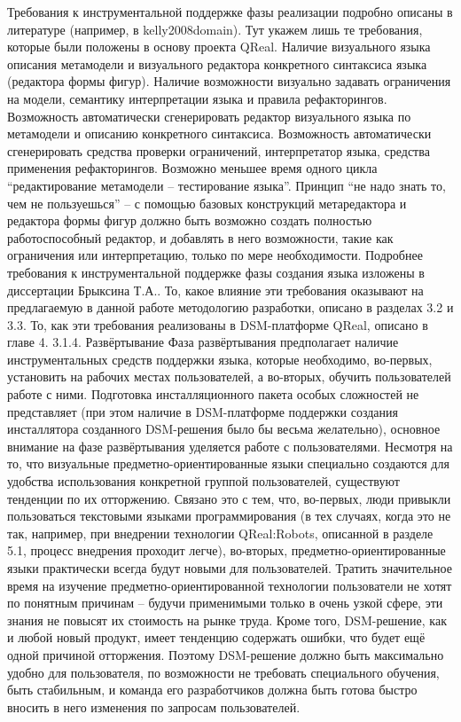 	Требования к инструментальной поддержке фазы реализации подробно описаны в литературе (например, в kelly2008domain). Тут укажем лишь те требования, которые были положены в основу проекта QReal.
Наличие визуального языка описания метамодели и визуального редактора конкретного синтаксиса языка (редактора формы фигур).
Наличие возможности визуально задавать ограничения на модели, семантику интерпретации языка и правила рефакторингов.
Возможность автоматически сгенерировать редактор визуального языка по метамодели и описанию конкретного синтаксиса.
Возможность автоматически сгенерировать средства проверки ограничений, интерпретатор языка, средства применения рефакторингов.
Возможно меньшее время одного цикла “редактирование метамодели – тестирование языка”.
Принцип “не надо знать то, чем не пользуешься” – с помощью базовых конструкций метаредактора и редактора формы фигур должно быть возможно создать полностью работоспособный редактор, и добавлять в него возможности, такие как ограничения или интерпретацию, только по мере необходимости.
	Подробнее требования к инструментальной поддержке фазы создания языка изложены в диссертации Брыксина Т.А.. То, какое влияние эти требования оказывают на предлагаемую в данной работе методологию разработки, описано в разделах 3.2 и 3.3. То, как эти требования реализованы в DSM-платформе QReal, описано в главе 4.
3.1.4. Развёртывание
	Фаза развёртывания предполагает наличие инструментальных средств поддержки языка, которые необходимо, во-первых, установить на рабочих местах пользователей, а во-вторых, обучить пользователей работе с ними. Подготовка инсталляционного пакета особых сложностей не представляет (при этом наличие в DSM-платформе поддержки создания инсталлятора созданного DSM-решения было бы весьма желательно), основное внимание на фазе развёртывания уделяется работе с пользователями. Несмотря на то, что визуальные предметно-ориентированные языки специально создаются для удобства использования конкретной группой пользователей, существуют тенденции по их отторжению. Связано это с тем, что, во-первых, люди привыкли пользоваться текстовыми языками программирования (в тех случаях, когда это не так, например, при внедрении технологии QReal:Robots, описанной в разделе 5.1, процесс внедрения проходит легче), во-вторых, предметно-ориентированные языки практически всегда будут новыми для пользователей. Тратить значительное время на изучение предметно-ориентированной технологии пользователи не хотят по понятным причинам – будучи применимыми только в очень узкой сфере, эти знания не повысят их стоимость на рынке труда. Кроме того, DSM-решение, как и любой новый продукт, имеет тенденцию содержать ошибки, что будет ещё одной причиной отторжения. Поэтому DSM-решение должно быть максимально удобно для пользователя, по возможности не требовать специального обучения, быть стабильным, и команда его разработчиков должна быть готова быстро вносить в него изменения по запросам пользователей.

